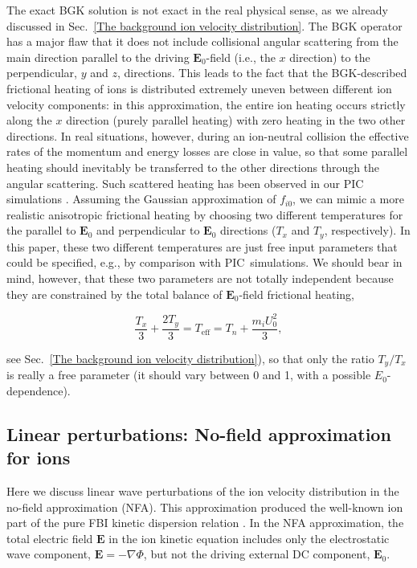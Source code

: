 \documentclass[draft]{agujournal2019}
\renewcommand{\vec}{\mathbf}
\begin{document}
{The exact BGK solution is not exact in the real physical sense, as we already discussed
in Sec.~\ref{The background ion velocity distribution}. The BGK operator has a
major flaw that it does not include collisional angular scattering from the
main direction parallel to the driving $\vec{E}_{0}$-field (i.e., the $x$
direction) to the perpendicular, $y$ and $z$, directions. This leads to the
fact that the BGK-described frictional heating of ions is distributed
extremely uneven between different ion velocity components: in this
approximation, the entire ion heating occurs strictly along the $x$ direction
(purely parallel heating) with zero heating in the two other directions. In
real situations, however, during an ion-neutral collision the effective rates
of the momentum and energy losses are close in value, so that some parallel
heating should inevitably be transferred to the other directions through the
angular scattering. Such scattered heating has been observed in our
PIC simulations \cite{Koontaweepunya:Non-Maxwellian24}. Assuming the Gaussian approximation of $f_{i0}$, we can
mimic a more realistic anisotropic frictional heating by choosing two
different temperatures for the parallel to $\vec{E}_0$ and perpendicular to $\vec{E}_0$
directions ($T_{x}$ and $T_{y}$, respectively). In this paper, these two different temperatures are
just free input parameters that could be specified, e.g., by comparison with
PIC\ simulations. We should bear in mind, however, that these two parameters
are not totally independent because they are constrained by the total balance of
$\vec{E}_{0}$-field frictional heating,
\begin{linenomath*}
\begin{equation}
\frac{T_{x}}{3}+\frac{2T_{y}}{3}=T_{\mathrm{eff}}=T_{n}+\frac{m_i U_{0}^{2}}{3},
\label{Ion_temperature_constrant}
\end{equation}
\end{linenomath*}
see Sec.~\ref{The background ion velocity distribution}), so that only the ratio
$T_{y}/T_{x}$ is really a free parameter (it should vary between 0
and 1, with a possible $E_{0}$-dependence).

\subsection{Linear perturbations: No-field approximation for
ions\label{No-field approximation for ions}}

Here we discuss linear wave perturbations of the ion velocity distribution in the no-field approximation 
(NFA). This approximation produced the well-known ion part of the pure FBI kinetic dispersion relation
\cite{Farley:Plasma63,Lee:High-Frequency71,Schmidt:Density73,Ossakow:Parallel75,Schlegel:Short83,Basu:Kinetic95}.
In the NFA approximation, the total electric field
$\vec{E}$ in the ion kinetic equation includes only the electrostatic wave component, $\vec
{E}=-\nabla\Phi$, but not the driving external DC component, $\vec{E}_{0}$.

}
\end{document}
